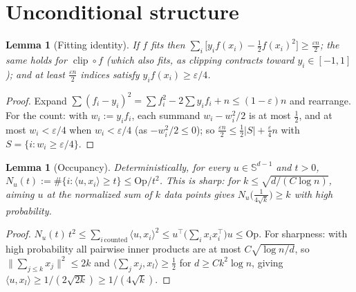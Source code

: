 \documentclass[11pt,reqno]{amsart}
\theoremstyle{plain}
\newtheorem{lemma}[theorem]{Lemma}
\theoremstyle{definition}
\theoremstyle{remark}
\newcommand{\Sd}{\mathbb{S}^{d-1}}
\newcommand{\eps}{\varepsilon}
\newcommand{\inn}[2]{\langle #1,#2\rangle}
\DeclareMathOperator{\clip}{clip}
\begin{document}
\section{Unconditional structure}

\begin{lemma}[Fitting identity]\label{lem:fitident}
If $f$ fits then $\sum_i\bigl[y_if(x_i)-\tfrac12f(x_i)^2\bigr]\ge\tfrac{\eps n}2$; the same holds for $\clip\circ f$ (which also fits, as clipping contracts toward $y_i\in[-1,1]$); and at least $\tfrac{\eps n}2$ indices satisfy $y_if(x_i)\ge\eps/4$.
\end{lemma}
\begin{proof}[Proof]
Expand $\sum(f_i-y_i)^2=\sum f_i^2-2\sum y_if_i+n\le(1-\eps)n$ and rearrange. For the count: with $w_i:=y_if_i$, each summand $w_i-w_i^2/2$ is at most $\tfrac12$, and at most $w_i<\eps/4$ when $w_i<\eps/4$ (as $-w_i^2/2\le0$); so $\tfrac{\eps n}2\le\tfrac12|S|+\tfrac{\eps}4n$ with $S=\{i:w_i\ge\eps/4\}$.
\end{proof}

\begin{lemma}[Occupancy]\label{lem:occupancy}
Deterministically, for every $u\in\Sd$ and $t>0$, $N_u(t):=\#\{i:\inn u{x_i}\ge t\}\le\mathrm{Op}/t^2$. This is sharp: for $k\le\sqrt{d/(C\log n)}$, aiming $u$ at the normalized sum of $k$ data points gives $N_u\bigl(\tfrac1{4\sqrt k}\bigr)\ge k$ with high probability.
\end{lemma}
\begin{proof}[Proof]
$N_u(t)\,t^2\le\sum_{i\,\mathrm{counted}}\inn u{x_i}^2\le u^\top\bigl(\sum_ix_ix_i^\top\bigr)u\le\mathrm{Op}$. For sharpness: with high probability all pairwise inner products are at most $C\sqrt{\log n/d}$, so $\|\sum_{j\le k}x_j\|^2\le2k$ and $\inn{\sum_jx_j}{x_l}\ge\tfrac12$ for $d\ge Ck^2\log n$, giving $\inn u{x_l}\ge1/(2\sqrt{2k})\ge1/(4\sqrt k)$.
\end{proof}
\end{document}
